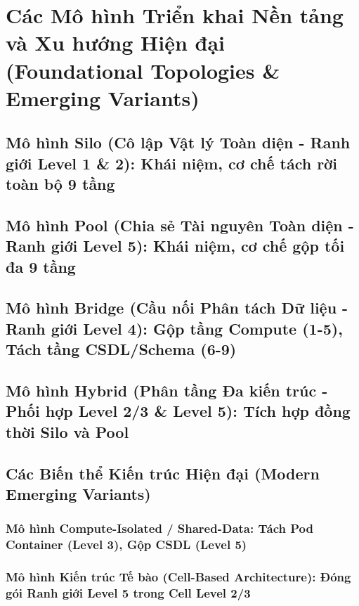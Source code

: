 \par{}
\section{Các Mô hình Triển khai Nền tảng và Xu hướng Hiện đại (Foundational Topologies \& Emerging Variants)}
\label{outline:2:topologies:1}

\par{}
\subsection{Mô hình Silo (Cô lập Vật lý Toàn diện - Ranh giới Level 1 \& 2): Khái niệm, cơ chế tách rời toàn bộ 9 tầng}
\label{outline:2:topologies:2}

\par{}
\subsection{Mô hình Pool (Chia sẻ Tài nguyên Toàn diện - Ranh giới Level 5): Khái niệm, cơ chế gộp tối đa 9 tầng}
\label{outline:2:topologies:3}

\par{}
\subsection{Mô hình Bridge (Cầu nối Phân tách Dữ liệu - Ranh giới Level 4): Gộp tầng Compute (1-5), Tách tầng CSDL/Schema (6-9)}
\label{outline:2:topologies:4}

\par{}
\subsection{Mô hình Hybrid (Phân tầng Đa kiến trúc - Phối hợp Level 2/3 \& Level 5): Tích hợp đồng thời Silo và Pool}
\label{outline:2:topologies:5}

\par{}
\subsection{Các Biến thể Kiến trúc Hiện đại (Modern Emerging Variants)}
\label{outline:2:topologies:6}

\par{}
\subsubsection{Mô hình Compute-Isolated / Shared-Data: Tách Pod Container (Level 3), Gộp CSDL (Level 5)}
\label{outline:2:topologies:7}

\par{}
\subsubsection{Mô hình Kiến trúc Tế bào (Cell-Based Architecture): Đóng gói Ranh giới Level 5 trong Cell Level 2/3}
\label{outline:2:topologies:8}
